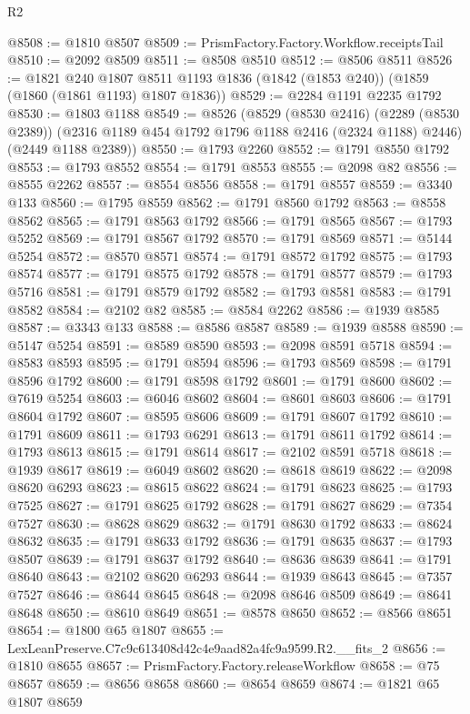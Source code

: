 \begin{lexlean}{R2}
\begin{coremodule}
@8508 := @1810 @8507
@8509 := PrismFactory.Factory.Workflow.receiptsTail
@8510 := @2092 @8509
@8511 := @8508 @8510
@8512 := @8506 @8511
@8526 := @1821
    @240
    @1807
    @8511
    @1193
    @1836
    (@1842 (@1853 @240))
    (@1859 (@1860 (@1861 @1193) @1807 @1836))
@8529 := @2284 @1191 @2235 @1792
@8530 := @1803 @1188
@8549 := @8526
    (@8529
      (@8530 @2416)
      (@2289 (@8530 @2389))
      (@2316 @1189 @454 @1792 @1796 @1188 @2416 (@2324 @1188) @2446)
      (@2449 @1188 @2389))
@8550 := @1793 @2260
@8552 := @1791 @8550 @1792
@8553 := @1793 @8552
@8554 := @1791 @8553
@8555 := @2098 @82
@8556 := @8555 @2262
@8557 := @8554 @8556
@8558 := @1791 @8557
@8559 := @3340 @133
@8560 := @1795 @8559
@8562 := @1791 @8560 @1792
@8563 := @8558 @8562
@8565 := @1791 @8563 @1792
@8566 := @1791 @8565
@8567 := @1793 @5252
@8569 := @1791 @8567 @1792
@8570 := @1791 @8569
@8571 := @5144 @5254
@8572 := @8570 @8571
@8574 := @1791 @8572 @1792
@8575 := @1793 @8574
@8577 := @1791 @8575 @1792
@8578 := @1791 @8577
@8579 := @1793 @5716
@8581 := @1791 @8579 @1792
@8582 := @1793 @8581
@8583 := @1791 @8582
@8584 := @2102 @82
@8585 := @8584 @2262
@8586 := @1939 @8585
@8587 := @3343 @133
@8588 := @8586 @8587
@8589 := @1939 @8588
@8590 := @5147 @5254
@8591 := @8589 @8590
@8593 := @2098 @8591 @5718
@8594 := @8583 @8593
@8595 := @1791 @8594
@8596 := @1793 @8569
@8598 := @1791 @8596 @1792
@8600 := @1791 @8598 @1792
@8601 := @1791 @8600
@8602 := @7619 @5254
@8603 := @6046 @8602
@8604 := @8601 @8603
@8606 := @1791 @8604 @1792
@8607 := @8595 @8606
@8609 := @1791 @8607 @1792
@8610 := @1791 @8609
@8611 := @1793 @6291
@8613 := @1791 @8611 @1792
@8614 := @1793 @8613
@8615 := @1791 @8614
@8617 := @2102 @8591 @5718
@8618 := @1939 @8617
@8619 := @6049 @8602
@8620 := @8618 @8619
@8622 := @2098 @8620 @6293
@8623 := @8615 @8622
@8624 := @1791 @8623
@8625 := @1793 @7525
@8627 := @1791 @8625 @1792
@8628 := @1791 @8627
@8629 := @7354 @7527
@8630 := @8628 @8629
@8632 := @1791 @8630 @1792
@8633 := @8624 @8632
@8635 := @1791 @8633 @1792
@8636 := @1791 @8635
@8637 := @1793 @8507
@8639 := @1791 @8637 @1792
@8640 := @8636 @8639
@8641 := @1791 @8640
@8643 := @2102 @8620 @6293
@8644 := @1939 @8643
@8645 := @7357 @7527
@8646 := @8644 @8645
@8648 := @2098 @8646 @8509
@8649 := @8641 @8648
@8650 := @8610 @8649
@8651 := @8578 @8650
@8652 := @8566 @8651
@8654 := @1800 @65 @1807
@8655 := LexLeanPreserve.C7c9c613408d42c4e9aad82a4fc9a9599.R2.__fits_2
@8656 := @1810 @8655
@8657 := PrismFactory.Factory.releaseWorkflow
@8658 := @75 @8657
@8659 := @8656 @8658
@8660 := @8654 @8659
@8674 := @1821
    @65
    @1807
    @8659

\end{coremodule}
\end{lexlean}
